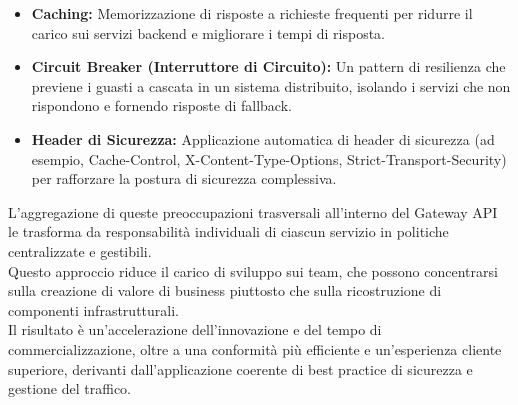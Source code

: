 \begin{itemize}
    \item \textbf{Caching:} Memorizzazione di risposte a richieste frequenti per ridurre il carico sui servizi backend e migliorare i tempi di risposta.
    \item \textbf{Circuit Breaker (Interruttore di Circuito):} Un pattern di resilienza che previene i guasti a cascata in un sistema distribuito, isolando i servizi che non rispondono e fornendo risposte di fallback.
    \item \textbf{Header di Sicurezza:} Applicazione automatica di header di sicurezza (ad esempio, Cache-Control, X-Content-Type-Options, Strict-Transport-Security) per rafforzare la postura di sicurezza complessiva.
\end{itemize}

L'aggregazione di queste preoccupazioni trasversali all'interno del Gateway API le trasforma da responsabilità individuali di ciascun servizio in politiche centralizzate e gestibili. \\
Questo approccio riduce il carico di sviluppo sui team, che possono concentrarsi sulla creazione di valore di business piuttosto che sulla ricostruzione di componenti infrastrutturali. \\
Il risultato è un'accelerazione dell'innovazione e del tempo di commercializzazione, oltre a una conformità più efficiente e un'esperienza cliente superiore, derivanti dall'applicazione coerente di best practice di sicurezza e gestione del traffico.

